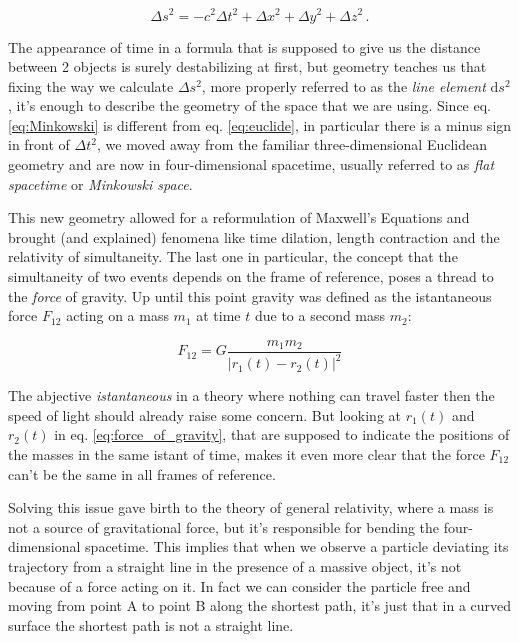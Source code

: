 \begin{equation}
    \Delta s^2 = - c^2 \Delta t^2 + \Delta x^2 + \Delta y^2 + \Delta z^2 \, .
    \label{eq:Minkowski}
\end{equation}

The appearance of time in a formula that is supposed to give us the distance
between 2 objects is surely destabilizing at first, but geometry teaches us
that fixing the way we calculate $\Delta s^2$, more properly referred to as the
\textit{line element} $\mathrm{d}s^2$, it's enough to describe the geometry of
the space that we are using.
Since eq. \ref{eq:Minkowski} is different from eq. \ref{eq:euclide}, in
particular there is a minus sign in front of $\Delta t^2$, we moved away from
the familiar three-dimensional Euclidean geometry and are now in
four-dimensional spacetime, usually referred to as \textit{flat spacetime} or
\textit{Minkowski space}.

This new geometry allowed for a reformulation of Maxwell's Equations and
brought (and explained) fenomena like time dilation, length contraction and the
relativity of simultaneity.
The last one in particular, the concept that the simultaneity of two events
depends on the frame of reference, poses a thread to the \textit{force} of
gravity.
Up until this point gravity was defined as the istantaneous force $F_{12}$
acting on a mass $m_1$ at time $t$ due to a second mass $m_2$:

\begin{equation}
    F_{12} = G \frac{m_1 m_2}{|r_1(t) - r_2(t)|^2}
    \label{eq:force_of_gravity}
\end{equation}

The abjective \textit{istantaneous} in a theory where nothing can travel faster
then the speed of light should already raise some concern.
But looking at $r_1(t)$ and $r_2(t)$ in eq. \ref{eq:force_of_gravity}, that are
supposed to indicate the positions of the masses in the same istant of time,
makes it even more clear that the force $F_{12}$ can't be the same in all
frames of reference.

Solving this issue gave birth to the theory of general relativity, where a mass
is not a source of gravitational force, but it's responsible for bending the
four-dimensional spacetime.
This implies that when we observe a particle deviating its trajectory from a
straight line in the presence of a massive object, it's not because of a force
acting on it.
In fact we can consider the particle free and moving from point A to point B
along the shortest path, it's just that in a curved surface the shortest path
is not a straight line.


